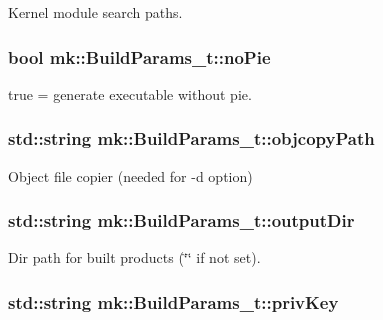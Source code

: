 Kernel module search paths. 

\subsubsection[{\texorpdfstring{no\+Pie}{noPie}}]{\setlength{\rightskip}{0pt plus 5cm}bool mk\+::\+Build\+Params\+\_\+t\+::no\+Pie}\hypertarget{structmk_1_1_build_params__t_a26f6bc40767d685542d66e19923f3614}{}\label{structmk_1_1_build_params__t_a26f6bc40767d685542d66e19923f3614}


true = generate executable without pie. 

\subsubsection[{\texorpdfstring{objcopy\+Path}{objcopyPath}}]{\setlength{\rightskip}{0pt plus 5cm}std\+::string mk\+::\+Build\+Params\+\_\+t\+::objcopy\+Path}\hypertarget{structmk_1_1_build_params__t_a99da33760ed094ef6907fa6e0141a33c}{}\label{structmk_1_1_build_params__t_a99da33760ed094ef6907fa6e0141a33c}


Object file copier (needed for -\/d option) 

\subsubsection[{\texorpdfstring{output\+Dir}{outputDir}}]{\setlength{\rightskip}{0pt plus 5cm}std\+::string mk\+::\+Build\+Params\+\_\+t\+::output\+Dir}\hypertarget{structmk_1_1_build_params__t_a06f93fa0c7f84473bc7b3c09867cc098}{}\label{structmk_1_1_build_params__t_a06f93fa0c7f84473bc7b3c09867cc098}


Dir path for built products (\char`\"{}\char`\"{} if not set). 

\subsubsection[{\texorpdfstring{priv\+Key}{privKey}}]{\setlength{\rightskip}{0pt plus 5cm}std\+::string mk\+::\+Build\+Params\+\_\+t\+::priv\+Key}\hypertarget{structmk_1_1_build_params__t_a5da477f972859d313f97eb34a0eae0bf}{}\label{structmk_1_1_build_params__t_a5da477f972859d313f97eb34a0eae0bf}


